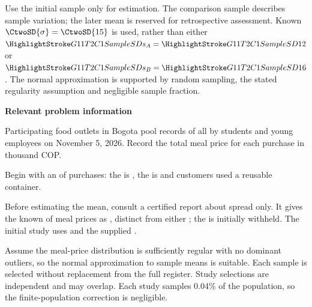 Use the initial sample only for estimation. The comparison sample describes sample variation; the later mean is reserved for retrospective assessment. Known $\CtwoSD{\sigma}=\CtwoSD{15}$ is used, rather than either $\SSD{s_A}=\SSD{12}$ or $\SSD{s_B}=\SSD{16}$. The normal approximation is supported by random sampling, the stated regularity assumption and negligible sample fraction.

\secInicio[][sec:p3]

\clearpage



\textbf{Relevant problem information}

\begin{probleminfoexcerpt}
Participating food outlets in Bogota pool records of all     by students and young employees on November 5, 2026. Record the total meal price for each purchase in thousand COP.
\end{probleminfoexcerpt}

\begin{probleminfoexcerpt}
Begin with an     of  purchases: the    is   , the    is    and  customers used a reusable container.
\end{probleminfoexcerpt}

\begin{probleminfoexcerpt}
Before estimating the mean, consult a certified report about spread only. It gives the known    of meal prices as   , distinct from either   ; the   is initially withheld. The initial study uses   and the supplied      .
\end{probleminfoexcerpt}

\begin{probleminfoexcerpt}
Assume the meal-price distribution is sufficiently regular with no dominant outliers, so the normal approximation to sample means is suitable. Each sample is selected without replacement from the full register. Study selections are independent and may overlap. Each study samples 0.04\% of the population, so the finite-population correction is negligible.
\end{probleminfoexcerpt}

